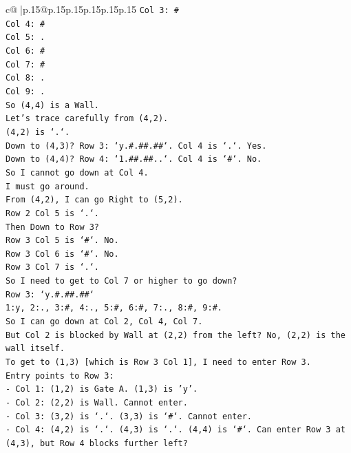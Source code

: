 \documentclass{article}
\begin{document}
{\begin{supertabular}{c@{$\;$}|p{.15\linewidth}@{}p{.15\linewidth}p{.15\linewidth}p{.15\linewidth}p{.15\linewidth}p{.15\linewidth}}
{{{\texttt{Col 3: \#} \\
\texttt{Col 4: \#} \\
\texttt{Col 5: .} \\
\texttt{Col 6: \#} \\
\texttt{Col 7: \#} \\
\texttt{Col 8: .} \\
\texttt{Col 9: .} \\
\texttt{So (4,4) is a Wall.} \\
\texttt{Let's trace carefully from (4,2).} \\
\texttt{(4,2) is `.`.} \\
\texttt{Down to (4,3)? Row 3: `y.\#.\#\#.\#\#`. Col 4 is `.`. Yes.} \\
\texttt{Down to (4,4)? Row 4: `1.\#\#.\#\#..`. Col 4 is `\#`. No.} \\
\texttt{So I cannot go down at Col 4.} \\
\texttt{I must go around.} \\
\texttt{From (4,2), I can go Right to (5,2).} \\
\texttt{Row 2 Col 5 is `.`.} \\
\texttt{Then Down to Row 3?} \\
\texttt{Row 3 Col 5 is `\#`. No.} \\
\texttt{Row 3 Col 6 is `\#`. No.} \\
\texttt{Row 3 Col 7 is `.`.} \\
\texttt{So I need to get to Col 7 or higher to go down?} \\
\texttt{Row 3: `y.\#.\#\#.\#\#`} \\
\texttt{1:y, 2:., 3:\#, 4:., 5:\#, 6:\#, 7:., 8:\#, 9:\#.} \\
\texttt{So I can go down at Col 2, Col 4, Col 7.} \\
\texttt{But Col 2 is blocked by Wall at (2,2) from the left? No, (2,2) is the wall itself.} \\
\texttt{To get to (1,3) {[}which is Row 3 Col 1{]}, I need to enter Row 3.} \\
\texttt{Entry points to Row 3:} \\
\texttt{{-} Col 1: (1,2) is Gate A. (1,3) is 'y'.} \\
\texttt{{-} Col 2: (2,2) is Wall. Cannot enter.} \\
\texttt{{-} Col 3: (3,2) is `.`. (3,3) is `\#`. Cannot enter.} \\
\texttt{{-} Col 4: (4,2) is `.`. (4,3) is `.`. (4,4) is `\#`. Can enter Row 3 at (4,3), but Row 4 blocks further left?} \\
}}}
\end{supertabular}}
\end{document}
